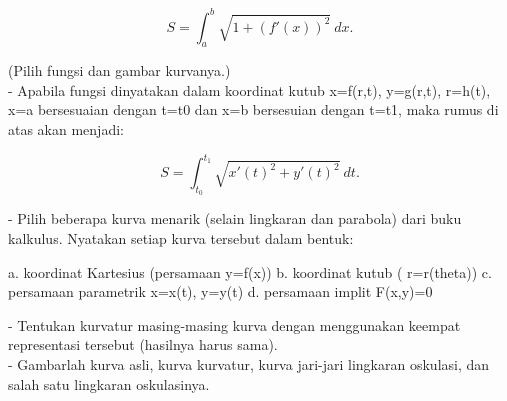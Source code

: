 \documentclass[a4paper,10pt]{article}
\begin{document}
\begin{eulernotebook}
\begin{eulercomment}
\begin{eulercomment}
\begin{eulercomment}
\begin{eulercomment}
\begin{eulercomment}
\begin{eulercomment}
\begin{eulercomment}
\begin{eulercomment}
\begin{eulercomment}
\begin{eulercomment}
\begin{eulercomment}
\begin{eulercomment}
\begin{eulercomment}
\begin{eulercomment}
\begin{eulercomment}
\begin{eulercomment}
\begin{eulercomment}
\begin{eulercomment}
\begin{eulercomment}
\begin{eulercomment}
\begin{eulercomment}
\begin{eulercomment}
\begin{eulercomment}
\end{eulercomment}
\begin{eulerformula}
\[
S = \int_a^b \sqrt{1+(f'(x))^2} \ dx.
\]
\end{eulerformula}
\begin{eulercomment}
(Pilih fungsi dan gambar kurvanya.)\\
- Apabila fungsi dinyatakan dalam koordinat kutub x=f(r,t), y=g(r,t),
r=h(t), x=a bersesuaian dengan t=t0 dan x=b bersesuian dengan t=t1,
maka rumus di atas akan menjadi:

\end{eulercomment}
\begin{eulerformula}
\[
S=\int_{t_0}^{t_1} \sqrt{x'(t)^2+y'(t)^2}\ dt.
\]
\end{eulerformula}
\begin{eulercomment}
- Pilih beberapa kurva menarik (selain lingkaran dan parabola) dari
buku  kalkulus. Nyatakan setiap kurva tersebut dalam bentuk:\\
\end{eulercomment}
\begin{eulerttcomment}
  a. koordinat Kartesius (persamaan y=f(x))
  b. koordinat kutub ( r=r(theta))
  c. persamaan parametrik x=x(t), y=y(t)
  d. persamaan implit F(x,y)=0
\end{eulerttcomment}
\begin{eulercomment}
- Tentukan kurvatur masing-masing kurva dengan menggunakan keempat
representasi tersebut (hasilnya harus sama).\\
- Gambarlah kurva asli, kurva kurvatur, kurva jari-jari lingkaran
oskulasi, dan salah satu lingkaran oskulasinya.


\end{eulercomment}
\end{eulercomment}
\end{eulercomment}
\end{eulercomment}
\end{eulercomment}
\end{eulercomment}
\end{eulercomment}
\end{eulercomment}
\end{eulercomment}
\end{eulercomment}
\end{eulercomment}
\end{eulercomment}
\end{eulercomment}
\end{eulercomment}
\end{eulercomment}
\end{eulercomment}
\end{eulercomment}
\end{eulercomment}
\end{eulercomment}
\end{eulercomment}
\end{eulercomment}
\end{eulercomment}
\end{eulercomment}
\end{eulernotebook}
\end{document}
